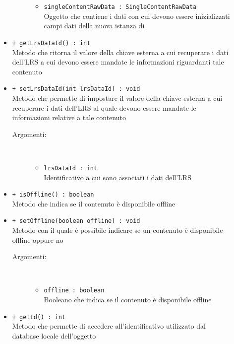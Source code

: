 \documentclass[../Tesi.tex]{subfiles}
\begin{document}
\begin{description}
\begin{itemize}
\begin{description}
\begin{itemize}
						\item \texttt{singleContentRawData : SingleContentRawData}\\
						Oggetto che contiene i dati con cui devono essere inizializzati campi dati della nuova istanza di 
					\end{itemize}
				\end{description}

				\item \texttt{+ getLrsDataId() : int}\\
				Metodo che ritorna il valore della chiave esterna a cui recuperare i dati dell'LRS a cui devono essere mandate le informazioni riguardanti tale contenuto

				\item \texttt{+ setLrsDataId(int lrsDataId) : void}\\
				Metodo che permette di impostare il valore della chiave esterna a cui recuperare i dati dell'LRS al quale devono essere mandate le informazioni relative a tale contenuto
				\begin{description}
					\item[Argomenti:] \
					\begin{itemize}
						\item \texttt{lrsDataId : int}\\
						Identificativo a cui sono associati i dati dell'LRS
					\end{itemize}
				\end{description}

				\item \texttt{+ isOffline() : boolean}\\
				Metodo che indica se il contenuto è disponibile offline

				\item \texttt{+ setOffline(boolean offline) : void}\\
				Metodo con il quale è possibile indicare se un contenuto è disponibile offline oppure no
				\begin{description}
					\item[Argomenti:] \
					\begin{itemize}
						\item \texttt{offline : boolean}\\
						Booleano che indica se il contenuto è disponibile offline
					\end{itemize}
				\end{description}

				\item \texttt{+ getId() : int}\\
				Metodo che permette di accedere all'identificativo utilizzato dal database locale dell'oggetto


\end{itemize}
\end{description}
\end{document}
